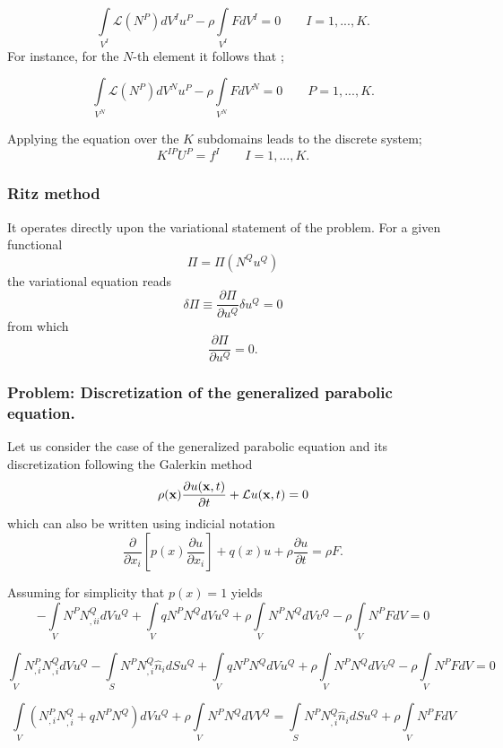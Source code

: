 \[\int\limits_{{V^I}} {\mathcal{L}({N^P})d{V^I}{u^P}}  - \rho \int\limits_{{V^I}} {Fd{V^I}}  = 0 \quad \quad I=1,...,K.\] For instance, for the $N$-th element it follows that ;

\[\int\limits_{{V^N}} {\mathcal{L}({N^P})d{V^N}{u^P}}  - \rho \int\limits_{{V^N}} {Fd{V^N}}  = 0 \quad \quad P=1,...,K.\]

Applying the equation over the $K$ subdomains leads to the discrete system;
\begin{equation}
{K^{IP}}{U^P} = {f^I} \quad \quad I=1,...,K.
\label{eq:Sundomain}
\end{equation}

\subsubsection{Ritz method} It operates directly upon the variational statement of the problem. For a given functional
\[\Pi  = \Pi ({N^Q}{u^Q})\]
the variational equation reads
\[\delta \Pi  \equiv \frac{{\partial \Pi }}{{\partial {u^Q}}}\delta {u^Q} = 0\]
from which
\[\frac{{\partial \Pi }}{{\partial {u^Q}}} = 0.\]

\subsubsection*{Problem: Discretization of the generalized parabolic equation.}
Let us consider the case of the generalized parabolic equation and its discretization following the Galerkin method
\[\rho(\vb x) \pdv{u(\vb x,t)}{t} + \mathcal{L}u(\vb x, t) = 0\]
which can also be written using indicial notation
\[\frac{\partial }{{\partial {x_i}}}\left[ {p(x)\frac{{\partial u}}{{\partial {x_i}}}} \right] + q(x)u + \rho \frac{{\partial u}}{{\partial t}} = \rho F.\]

Assuming for simplicity that $p(x)=1$ yields
\[ - \int\limits_V {{N^P}N_{,ii}^Q} dV{u^Q} + \int\limits_V {q{N^P}{N^Q}dV{u^Q}}  + \rho \int\limits_V {{N^P}{N^Q}dV{v^Q}}  - \rho \int\limits_V {{N^P}FdV = 0} \]

\[\int\limits_V {N_{,i}^PN_{,i}^Q} dV{u^Q} - \int\limits_S {{N^P}N_{,i}^Q{{\hat n}_i}} dS{u^Q} + \int\limits_V {q{N^P}{N^Q}dV{u^Q}}  + \rho \int\limits_V {{N^P}{N^Q}dV{v^Q}}  - \rho \int\limits_V {{N^P}FdV = 0} \]

\[\int\limits_V {\left( {N_{,i}^PN_{,i}^Q + q{N^P}{N^Q}} \right)dV{u^Q}}  + \rho \int\limits_V {{N^P}{N^Q}dV{V^Q}}  = \int\limits_S {{N^P}N_{,i}^Q{{\hat n}_i}} dS{u^Q} + \rho \int\limits_V {{N^P}FdV} \]

